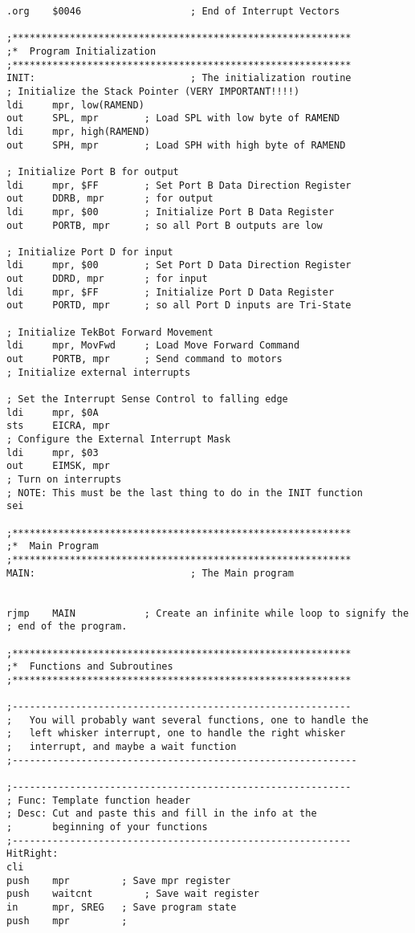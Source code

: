\documentclass[12pt,letterpaper]{article}
\begin{document}
\begin{verbatim}
.org	$0046					; End of Interrupt Vectors

;***********************************************************
;*	Program Initialization
;***********************************************************
INIT:							; The initialization routine
; Initialize the Stack Pointer (VERY IMPORTANT!!!!)
ldi		mpr, low(RAMEND)
out		SPL, mpr		; Load SPL with low byte of RAMEND
ldi		mpr, high(RAMEND)
out		SPH, mpr		; Load SPH with high byte of RAMEND

; Initialize Port B for output
ldi		mpr, $FF		; Set Port B Data Direction Register
out		DDRB, mpr		; for output
ldi		mpr, $00		; Initialize Port B Data Register
out		PORTB, mpr		; so all Port B outputs are low		

; Initialize Port D for input
ldi		mpr, $00		; Set Port D Data Direction Register
out		DDRD, mpr		; for input
ldi		mpr, $FF		; Initialize Port D Data Register
out		PORTD, mpr		; so all Port D inputs are Tri-State

; Initialize TekBot Forward Movement
ldi		mpr, MovFwd		; Load Move Forward Command
out		PORTB, mpr		; Send command to motors
; Initialize external interrupts

; Set the Interrupt Sense Control to falling edge 
ldi		mpr, $0A
sts		EICRA, mpr
; Configure the External Interrupt Mask
ldi		mpr, $03
out		EIMSK, mpr
; Turn on interrupts
; NOTE: This must be the last thing to do in the INIT function
sei

;***********************************************************
;*	Main Program
;***********************************************************
MAIN:							; The Main program


rjmp	MAIN			; Create an infinite while loop to signify the 
; end of the program.

;***********************************************************
;*	Functions and Subroutines
;***********************************************************

;-----------------------------------------------------------
;	You will probably want several functions, one to handle the 
;	left whisker interrupt, one to handle the right whisker 
;	interrupt, and maybe a wait function
;------------------------------------------------------------

;-----------------------------------------------------------
; Func: Template function header
; Desc: Cut and paste this and fill in the info at the 
;		beginning of your functions
;-----------------------------------------------------------
HitRight:
cli
push	mpr			; Save mpr register
push	waitcnt			; Save wait register
in		mpr, SREG	; Save program state
push	mpr			;


\end{verbatim}
\end{document}
